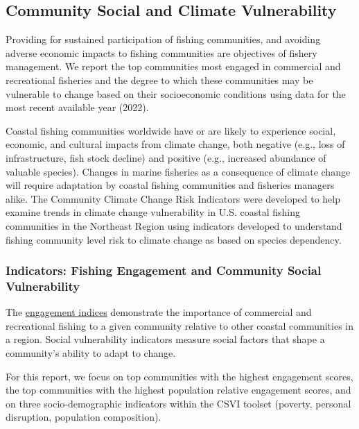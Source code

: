 \documentclass[
  10pt,
]{article}
\begin{document}
\hypertarget{social-vulnerability}{%
\subsection{Community Social and Climate Vulnerability}\label{social-vulnerability}}

Providing for sustained participation of fishing communities, and avoiding adverse economic impacts to fishing communities are objectives of fishery management. We report the top communities most engaged in commercial and recreational fisheries and the degree to which these communities may be vulnerable to change based on their socioeconomic conditions using data for the most recent available year (2022).

Coastal fishing communities worldwide have or are likely to experience social, economic, and cultural impacts from climate change, both negative (e.g., loss of infrastructure, fish stock decline) and positive (e.g., increased abundance of valuable species). Changes in marine fisheries as a consequence of climate change will require adaptation by coastal fishing communities and fisheries managers alike. The Community Climate Change Risk Indicators were developed to help examine trends in climate change vulnerability in U.S. coastal fishing communities in the Northeast Region using indicators developed to understand fishing community level risk to climate change as based on species dependency.

\hypertarget{indicators-fishing-engagement-and-community-social-vulnerability}{%
\subsubsection{Indicators: Fishing Engagement and Community Social Vulnerability}\label{indicators-fishing-engagement-and-community-social-vulnerability}}

The \href{https://noaa-edab.github.io/catalog/engagement.html}{engagement indices} demonstrate the importance of commercial and recreational fishing to a given community relative to other coastal communities in a region. Social vulnerability indicators measure social factors that shape a community's ability to adapt to change.

For this report, we focus on top communities with the highest engagement scores, the top communities with the highest population relative engagement scores, and on three socio-demographic indicators within the CSVI toolset (poverty, personal disruption, population composition).
\end{document}
